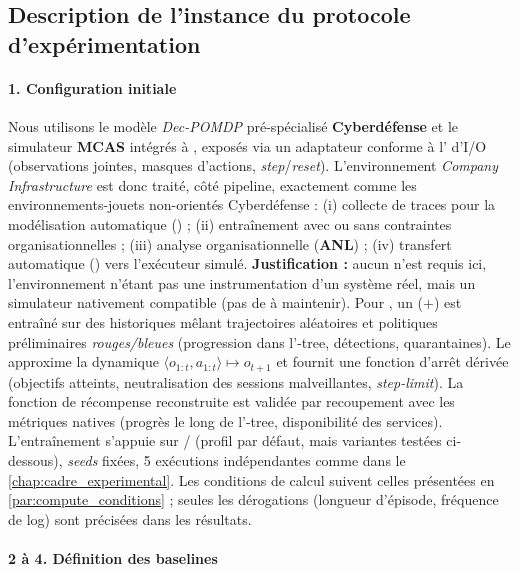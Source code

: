 \subsection{Description de l'instance du protocole d'expérimentation}

\paragraph{1. Configuration initiale}

Nous utilisons le modèle \emph{Dec-POMDP} pré-spécialisé \textbf{Cyberdéfense} et le simulateur \textbf{MCAS} intégrés à , exposés via un adaptateur  conforme à l' d'I/O  (observations jointes, masques d'actions, \emph{step}/\emph{reset}). L'environnement \emph{Company Infrastructure} est donc traité, côté pipeline, exactement comme les environnements-jouets non-orientés Cyberdéfense : (i) collecte de traces pour la modélisation automatique () ; (ii) entraînement  avec ou sans contraintes organisationnelles ; (iii) analyse organisationnelle (\textbf{ANL}) ; (iv) transfert automatique () vers l'exécuteur simulé.
\textbf{Justification :} aucun  n'est requis ici, l'environnement n'étant pas une instrumentation d'un système réel, mais un simulateur nativement compatible (pas de  à maintenir).
Pour , un  (+) est entraîné sur des historiques mêlant trajectoires aléatoires et politiques préliminaires \emph{rouges/bleues} (progression dans l'-tree, détections, quarantaines). Le  approxime la dynamique $\langle o_{1:t},a_{1:t} \rangle \mapsto o_{t+1}$ et fournit une fonction d'arrêt dérivée (objectifs atteints, neutralisation des sessions malveillantes, \emph{step-limit}). La fonction de récompense reconstruite est validée par recoupement avec les métriques natives (progrès le long de l'-tree, disponibilité des services). L'entraînement s'appuie sur / (profil  par défaut, mais variantes testées ci-dessous), \emph{seeds} fixées, 5 exécutions indépendantes comme dans le \autoref{chap:cadre_experimental}. Les conditions de calcul suivent celles présentées en \autoref{par:compute_conditions} ; seules les dérogations (longueur d'épisode, fréquence de log) sont précisées dans les résultats.

\paragraph{2 à 4. Définition des baselines}


